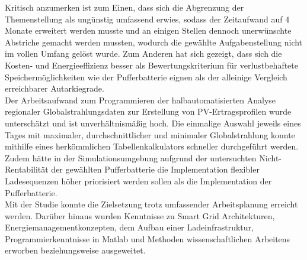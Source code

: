 	Kritisch anzumerken ist zum Einen, dass sich die Abgrenzung der Themenstellung als ungünstig umfassend erwies, sodass der Zeitaufwand auf 4 Monate erweitert werden musste und an einigen Stellen dennoch unerwünschte Abstriche gemacht werden mussten, wodurch die gewählte Aufgabenstellung nicht im vollen Umfang gelöst wurde. Zum Anderen hat sich gezeigt, dass sich die Kosten- und Energieeffizienz besser als Bewertungskriterium für verlustbehaftete Speichermöglichkeiten wie der Pufferbatterie eignen als der alleinige Vergleich erreichbarer Autarkiegrade. \\
    
	Der Arbeitsaufwand zum Programmieren der halbautomatisierten Analyse regionaler Globalstrahlungsdaten zur Erstellung von PV-Ertragsprofilen wurde unterschätzt und ist unverhältnismäßig hoch. Die einmalige Auswahl jeweils eines Tages mit maximaler, durchschnittlicher und minimaler Globalstrahlung konnte mithilfe eines herkömmlichen Tabellenkalkulators schneller durchgeführt werden. Zudem hätte in der Simulationsumgebung aufgrund der untersuchten Nicht-Rentabilität der gewählten Pufferbatterie die Implementation flexibler Ladesequenzen höher priorisiert werden sollen als die Implementation der Pufferbatterie. \\
    
    Mit der Studie konnte die Zielsetzung trotz umfassender Arbeitsplanung erreicht werden. Darüber hinaus wurden Kenntnisse zu Smart Grid Architekturen, Energiemanagementkonzepten, dem Aufbau einer Ladeinfrastruktur, Programmierkenntnisse in Matlab und Methoden wissenschaftlichen Arbeitens erworben beziehungsweise ausgeweitet.



    
    

    